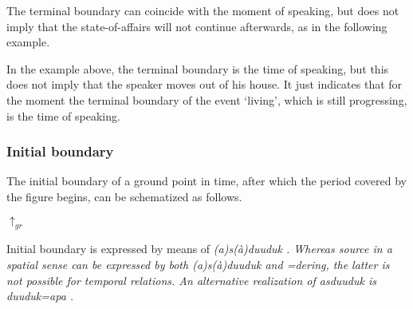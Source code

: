 The terminal boundary can coincide with the moment of speaking, but does not imply that the state-of-affairs will not continue afterwards, as in the following example.


In the example above, the terminal boundary is the time of speaking, but this does not imply that the speaker moves out of his house. It just indicates that for the moment the terminal boundary of the event `living', which is still progressing, is the time of speaking.



\subsubsection{Initial boundary}\label{sec:func:Initialboundary}
The initial boundary of a ground point in time, after which the period covered by the figure begins, can be schematized as follows.

\parbox{8cm}{
\z
 {\Large \vspace{-0.5cm}\hspace{1.15cm}  $\uparrow_{gr} $}\\
}

Initial boundary is expressed by means of \em (a)s(à)duuduk \em {} . Whereas source in a spatial sense can be expressed by both \em (a)s(à)duuduk \em and \em =dering\em, the latter is not possible for temporal relations. An alternative realization of \em asduuduk \em is \em duuduk=apa \em {}.


%



